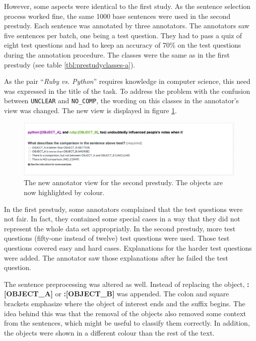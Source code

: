 However, some aspects were identical to the first study. As the sentence selection process worked fine, the same 1000 base sentences were used in the second prestudy.  Each sentence was annotated by three annotators. The annotators saw five sentences per batch, one being a test question. They had to pass a quiz of eight test questions and had to keep an accuracy of 70\% on the test questions during the annotation procedure. The classes were the same as in the first prestudy (see table \ref{tbl:prestudyclasses-a}).

As the pair \enquote{\emph{Ruby vs. Python}} requires knowledge in computer science, this need was expressed in the title of the task.
To address the problem with the confusion between \texttt{UNCLEAR} and \texttt{NO\_COMP}, the wording on this classes in the annotator's view was changed. The new view is displayed in figure \ref{img:2_question}. 

\begin{figure}[h]
\centering
\includegraphics[width=1\textwidth]{images/prestudy/2_question}

\caption{The new annotator view for the second prestudy. The objects are now highlighted by colour.}
\label{img:2_question}
\end{figure}

In the first prestudy, some annotators complained that the test questions were not fair. In fact, they contained some special cases in a way that they did not represent the whole data set appropriatly. In the second prestudy, more test questions (fifty-one instead of twelve) test questions were used. Those test questions covered easy and hard cases. Explanations for the harder test questions were added. The annotator saw those explanations after he failed the test question.



The sentence preprocessing was altered as well. Instead of replacing the object, \mbox{\textbf{{\color[HTML]{9A14B2}:{[}OBJECT\_A{]}}}} or \textbf{{\color[HTML]{6CB219}:{[}OBJECT\_B{]}}} was appended. The colon and square brackets emphasize where the object of interest ends and the suffix begins. The idea behind this was that the removal of the objects also removed some context from the sentences, which might be useful to classify them correctly. In addition, the objects were shown in a different colour than the rest of the text.\newline



